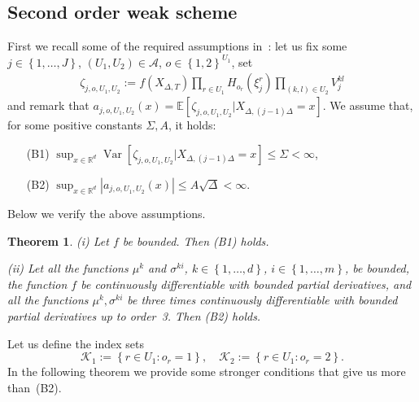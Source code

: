 \documentclass[11pt,a4paper]{amsart}
\theoremstyle{plain}
\newtheorem{theorem}{Theorem}[section]
\theoremstyle{definition}
\theoremstyle{remark}
\numberwithin{equation}{section}
\newcommand*{\R}{\mathbb{R}}
\newcommand*{\Var}{\operatorname{Var}}
\newcommand*{\EE}{\mathbb E}
\newcommand*{\cK}{\mathcal K}
\renewcommand*{\doteq}{:=}
\begin{document}
\subsection{Second order weak scheme}
\label{sec:trunc:second}
First we recall some of the required assumptions in~\cite{belomestny2016variance}:
let us fix some $j\in\left\{1,\ldots, J\right\}$, $(U_1,U_2)\in\mathcal{A}$, $o\in\left\{1,2\right\}^{U_1}$, set
\begin{align*}
\zeta_{j,o,U_1,U_2}\doteq f(X_{\Delta,T})
\prod_{r\in U_1} H_{o_r}(\xi_j^r)
\prod_{(k,l)\in U_2} V_j^{kl}
\end{align*}
and remark that
$a_{j,o,U_1,U_2}(x)=\EE[\zeta_{j,o,U_1,U_2}|X_{\Delta, (j-1)\Delta}=x
]$. We assume that, for some positive
constants $\Sigma,A$, it holds:
\begin{itemize}
\item[(B1)]
$\sup_{x\in\R^d}\Var[\zeta_{j,o,U_1,U_2}|X_{\Delta,(j-1)\Delta}=x]
\le\Sigma<\infty$,
\item[(B2)]
$\sup_{x\in\R^d} |a_{j,o,U_1,U_2}(x)|\le A\sqrt{\Delta}<\infty$.
\end{itemize}
Below we verify the above assumptions.

\begin{theorem}
\label{th:second_old}
(i)
Let $f$ be bounded. Then (B1) holds.

(ii) Let all the functions $\mu^k$ and $\sigma^{ki}$, $k\in\left\{1,\ldots,d\right\}$, $i\in\left\{1,\ldots,m\right\}$, be bounded,
the function $f$ be continuously differentiable
with bounded partial derivatives,
and all the functions $\mu^k,\sigma^{ki}$ be three times
continuously differentiable with bounded partial derivatives up to order~3. Then (B2) holds.
\end{theorem}

Let us define the index sets
$$
\mathcal{K}_1:=\left\{r\in U_1:o_r=1\right\},\quad
\mathcal{K}_2:=\left\{r\in U_1:o_r=2\right\}.
$$
In the following theorem we provide some stronger
conditions that give us more than~(B2).
\end{document}
